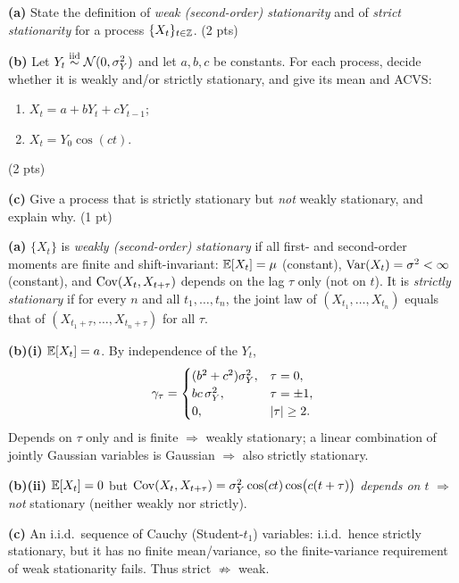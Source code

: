 \documentclass[11pt]{article}
\begin{document}

\statementstart
\textbf{(a)} State the definition of \emph{weak (second-order) stationarity} and of \emph{strict stationarity} for a process $\{X_t\}_{t\in\mathbb{Z}}$. \hfill(2 pts)

\textbf{(b)} Let $Y_t\overset{\text{iid}}{\sim}\mathcal N(0,\sigma_Y^2)$ and let $a,b,c$ be constants. For each process, decide whether it is weakly and/or strictly stationary, and give its mean and ACVS:
\begin{enumerate}[label=(\roman*)]
  \item $X_t = a + bY_t + cY_{t-1}$;
  \item $X_t = Y_0\cos(ct)$.
\end{enumerate}\hfill(2 pts)

\textbf{(c)} Give a process that is strictly stationary but \emph{not} weakly stationary, and explain why. \hfill(1 pt)
\statementend

\textbf{(a)} $\{X_t\}$ is \emph{weakly (second-order) stationary} if all first- and second-order moments are finite and shift-invariant: $\mathbb{E}[X_t]=\mu$ (constant), $\operatorname{Var}(X_t)=\sigma^2<\infty$ (constant), and $\operatorname{Cov}(X_t,X_{t+\tau})$ depends on the lag $\tau$ only (not on $t$). It is \emph{strictly stationary} if for every $n$ and all $t_1,\dots,t_n$, the joint law of $(X_{t_1},\dots,X_{t_n})$ equals that of $(X_{t_1+\tau},\dots,X_{t_n+\tau})$ for all $\tau$.

\textbf{(b)(i)} $\mathbb{E}[X_t]=a$. By independence of the $Y_t$,
\[
\gamma_\tau=\begin{cases}(b^2+c^2)\sigma_Y^2,&\tau=0,\\ bc\,\sigma_Y^2,&\tau=\pm1,\\ 0,&\left\lvert \tau \right\rvert\ge2.\end{cases}
\]
Depends on $\tau$ only and is finite $\Rightarrow$ weakly stationary; a linear combination of jointly Gaussian variables is Gaussian $\Rightarrow$ also strictly stationary.

\textbf{(b)(ii)} $\mathbb{E}[X_t]=0$ but $\operatorname{Cov}(X_t,X_{t+\tau})=\sigma_Y^2\cos(ct)\cos\!\big(c(t+\tau)\big)$ \emph{depends on $t$} $\Rightarrow$ \emph{not} stationary (neither weakly nor strictly).

\textbf{(c)} An i.i.d.\ sequence of Cauchy (Student-$t_1$) variables: i.i.d.\ hence strictly stationary, but it has no finite mean/variance, so the finite-variance requirement of weak stationarity fails. Thus strict $\not\Rightarrow$ weak.
\end{document}
